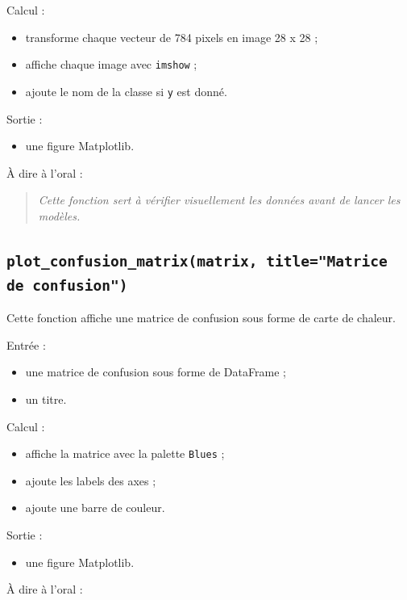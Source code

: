 \documentclass[11pt,a4paper]{article}
\begin{document}
Calcul :

\begin{itemize}
\item transforme chaque vecteur de 784 pixels en image 28 x 28 ;
\item affiche chaque image avec \texttt{imshow} ;
\item ajoute le nom de la classe si \texttt{y} est donné.
\end{itemize}

Sortie :

\begin{itemize}
\item une figure Matplotlib.
\end{itemize}

À dire à l'oral :

\begin{quote}
\itshape Cette fonction sert à vérifier visuellement les données avant de lancer les modèles.
\end{quote}

\subsection{\texttt{plot\_confusion\_matrix(matrix, title="Matrice de confusion")}}

Cette fonction affiche une matrice de confusion sous forme de carte de chaleur.

Entrée :

\begin{itemize}
\item une matrice de confusion sous forme de DataFrame ;
\item un titre.
\end{itemize}

Calcul :

\begin{itemize}
\item affiche la matrice avec la palette \texttt{Blues} ;
\item ajoute les labels des axes ;
\item ajoute une barre de couleur.
\end{itemize}

Sortie :

\begin{itemize}
\item une figure Matplotlib.
\end{itemize}

À dire à l'oral :
\end{document}
